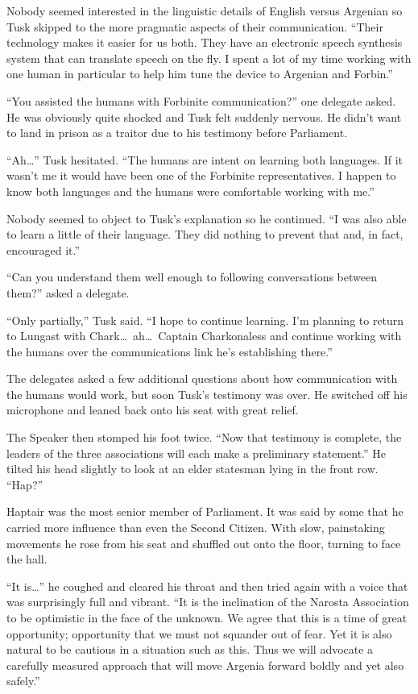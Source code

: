 Nobody seemed interested in the linguistic details of English versus Argenian so Tusk skipped to
the more pragmatic aspects of their communication. ``Their technology makes it easier for us
both. They have an electronic speech synthesis system that can translate speech on the fly. I
spent a lot of my time working with one human in particular to help him tune the device to
Argenian and Forbin.''

``You assisted the humans with Forbinite communication?'' one delegate asked. He was obviously
quite shocked and Tusk felt suddenly nervous. He didn't want to land in prison as a traitor due
to his testimony before Parliament.

``Ah\ldots'' Tusk hesitated. ``The humans are intent on learning both languages. If it wasn't me
it would have been one of the Forbinite representatives. I happen to know both languages and
the humans were comfortable working with me.''

Nobody seemed to object to Tusk's explanation so he continued. ``I was also able to learn a
little of their language. They did nothing to prevent that and, in fact, encouraged it.''

``Can you understand them well enough to following conversations between them?'' asked a
delegate.

``Only partially,'' Tusk said. ``I hope to continue learning. I'm planning to return to Lungast
with Chark\ldots\ ah\ldots\ Captain Charkonaless and continue working with the humans over the
communications link he's establishing there.''

The delegates asked a few additional questions about how communication with the humans would
work, but soon Tusk's testimony was over. He switched off his microphone and leaned back onto
his seat with great relief.

The Speaker then stomped his foot twice. ``Now that testimony is complete, the leaders of the
three associations will each make a preliminary statement.'' He tilted his head slightly to look
at an elder statesman lying in the front row. ``Hap?''

Haptair was the most senior member of Parliament. It was said by some that he carried more
influence than even the Second Citizen. With slow, painstaking movements he rose from his seat
and shuffled out onto the floor, turning to face the hall.

``It is\ldots'' he coughed and cleared his throat and then tried again with a voice that was
surprisingly full and vibrant. ``It is the inclination of the Narosta Association to be
optimistic in the face of the unknown. We agree that this is a time of great opportunity;
opportunity that we must not squander out of fear. Yet it is also natural to be cautious in a
situation such as this. Thus we will advocate a carefully measured approach that will move
Argenia forward boldly and yet also safely.''

